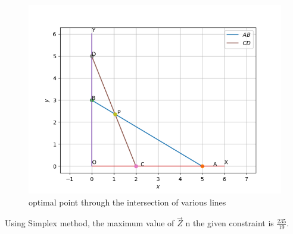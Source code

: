 \documentclass[journal,12pt,twocolumn]{IEEEtran}
\begin{document}
\begin{figure}[h]
\includegraphics[width=\columnwidth]{Figure_1.png}
\caption{optimal point through the intersection of various lines}
\label{fig:Figure_1}
\end{figure}
Using Simplex method, the maximum value of $\vec{Z}$ n the given constraint is $\frac{235}{19}$.
\end{document}
